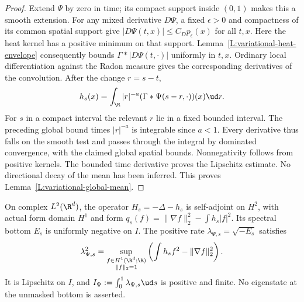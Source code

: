 \begin{proof}
  Extend $\Psi$ by zero in time; its compact support inside $(0,1)$
  makes this a smooth extension. For any mixed derivative $D\Psi$,
  a fixed $\epsilon>0$ and compactness of its common spatial support
  give $|D\Psi(t,x)|\le C_Dp_\epsilon(x)$ for all $t,x$.
  Here the heat kernel has a positive minimum on that support.
  Lemma~\ref{L:variational-heat-envelope} consequently bounds
  $\Gamma*|D\Psi(t,\cdot)|$ uniformly in $t,x$.
  Ordinary local differentiation against the Radon measure gives
  the corresponding derivatives of the convolution.
  After the change $r=s-t$,
  \[
    h_s(x)=\int_\R |r|^{-a}
    (\Gamma*\Psi(s-r,\cdot))(x)\ud r.
  \]
  For $s$ in a compact interval the relevant $r$ lie in a fixed
  bounded interval. The preceding global bound times $|r|^{-a}$
  is integrable since $a<1$.
  Every derivative thus falls on the smooth test and passes through
  the integral by dominated convergence, with the claimed global
  spatial bounds. Nonnegativity follows from positive kernels.
  The bounded time derivative proves the Lipschitz estimate.
  No directional decay of the mean has been inferred.
  This proves Lemma~\ref{L:variational-global-mean}.
\end{proof}

\begin{proposition}
  \label{P:variational-unmasked-rate}
  On complex $L^2(\R^d)$, the operator $H_s=-\Delta-h_s$ is
  self-adjoint on $H^2$, with actual form domain $H^1$ and form
  $q_s(f)=\|\nabla f\|_2^2-\int h_s|f|^2$.
  Its spectral bottom $E_s$ is uniformly negative on $I$.
  The positive rate $\lambda_{\Psi,s}=\sqrt{-E_s}$ satisfies
  \begin{equation}\label{E:variational-real-rayleigh}
    \lambda_{\Psi,s}^2
    =\sup_{\substack{f\in H^1(\R^d;\R)\\\|f\|_2=1}}
    \left(\int h_sf^2-\|\nabla f\|_2^2\right).
  \end{equation}
  It is Lipschitz on $I$, and
  $I_\Psi:=\int_0^1\lambda_{\Psi,s}\ud s$ is positive and finite.
  No eigenstate at the unmasked bottom is asserted.
\end{proposition}

